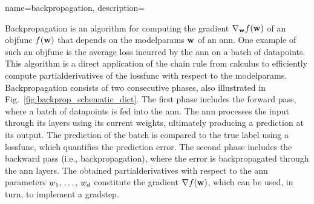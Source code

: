 {name={backpropagation},
 	description={Backpropagation is an \gls{algorithm} for computing the \gls{gradient} 
	 	$\nabla_{{\bf w}} f({\bf w})$ of an \gls{objfunc} $f({\bf w})$ that depends on the 
	  	\glspl{modelparam} ${\bf w}$ of an \gls{ann}. One example of such an \gls{objfunc} 
	  	is the average \gls{loss} incurred by the \gls{ann} on a \gls{batch} of \glspl{datapoint}. 
	  	This \gls{algorithm} is a direct application of the chain rule from calculus to 
	  	efficiently compute \glspl{partialderivative} of the \gls{lossfunc} with respect to the \glspl{modelparam}.
		Backpropagation consists of two consecutive phases, also illustrated in Fig.\ \ref{fig:backprop_schematic_dict}. 
		The first phase includes the forward pass, where a \gls{batch} of 
		\glspl{datapoint} is fed into the \gls{ann}. The \gls{ann} processes the input through its \glspl{layer} using its current 
		\glspl{weight}, ultimately producing a \gls{prediction} at its \gls{output}. The \gls{prediction} of the \gls{batch} is compared to 
	   	the true \gls{label} using a \gls{lossfunc}, which quantifies the \gls{prediction} error. The second phase includes the 
		backward pass (i.e., backpropagation), where the error is backpropagated through the \gls{ann} \glspl{layer}. 
	   	The obtained \glspl{partialderivative} with respect to the \gls{ann} \glspl{parameter} $w_{1},\,\ldots,\,w_{d}$ 
	   	constitute the \gls{gradient} $\nabla f({\bf w})$, which can be used, in turn, to implement a \gls{gradstep}.
	   	\begin{figure}[H]
		\centering
\end{figure}}}
